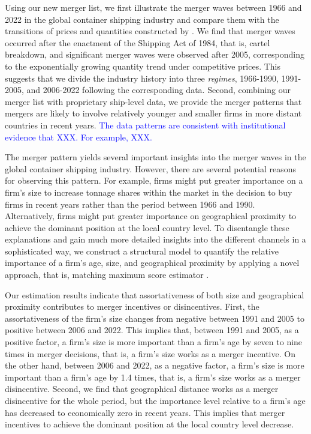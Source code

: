 \documentclass[10pt]{article}
\begin{document}
Using our new merger list, we first illustrate the merger waves between 1966 and 2022 in the global container shipping industry and compare them with the transitions of prices and quantities constructed by \cite{matsuda2022unified}. 
We find that merger waves occurred after the enactment of the Shipping Act of 1984, that is, cartel breakdown, and significant merger waves were observed after 2005, corresponding to the exponentially growing quantity trend under competitive prices.
This suggests that we divide the industry history into three \textit{regimes}, 1966-1990, 1991-2005, and 2006-2022 following the corresponding data.
Second, combining our merger list with proprietary ship-level data, we provide the merger patterns that mergers are likely to involve relatively younger and smaller firms in more distant countries in recent years. 
\textcolor{blue}{The data patterns are consistent with institutional evidence that XXX. For example, XXX.}

The merger pattern yields several important insights into the merger waves in the global container shipping industry. 
However, there are several potential reasons for observing this pattern. 
For example, firms might put greater importance on a firm's size to increase tonnage shares within the market in the decision to buy firms in recent years rather than the period between 1966 and 1990. 
Alternatively, firms might put greater importance on geographical proximity to achieve the dominant position at the local country level. 
To disentangle these explanations and gain much more detailed insights into the different channels in a sophisticated way, we construct a structural model to quantify the relative importance of a firm's age, size, and geographical proximity by applying a novel approach, that is, matching maximum score estimator \cite{fox2018qe}. 

Our estimation results indicate that assortativeness of both size and geographical proximity contributes to merger incentives or disincentives. 
First, the assortativeness of the firm's size changes from negative between 1991 and 2005 to positive between 2006 and 2022. 
This implies that, between 1991 and 2005, as a positive factor, a firm's size is more important than a firm's age by seven to nine times in merger decisions, that is, a firm's size works as a merger incentive.
On the other hand, between 2006 and 2022, as a negative factor, a firm's size is more important than a firm's age by 1.4 times, that is, a firm's size works as a merger disincentive.
Second, we find that geographical distance works as a merger disincentive for the whole period, but the importance level relative to a firm's age has decreased to economically zero in recent years. 
This implies that merger incentives to achieve the dominant position at the local country level decrease.
\end{document}

